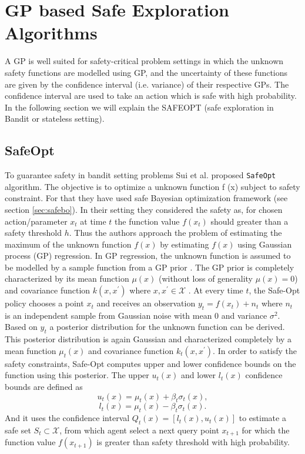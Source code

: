 \section{GP based Safe Exploration Algorithms}
A GP is well suited for safety-critical problem settings in which the unknown safety functions are modelled using GP, and the uncertainty of these functions are given by the confidence interval (i.e. variance) of their respective GPs. 
The confidence interval are used to take an action which is safe with high probability.
In the following section we will explain the SAFEOPT (safe exploration in Bandit or stateless setting).
\subsection{SafeOpt}
To guarantee safety in bandit setting problems Sui et al.\cite{sui15} proposed \texttt{SafeOpt} algorithm. The objective is to optimize a unknown function f (x) subject to safety constraint.
For that they have used safe Bayesian optimization framework (see section \ref{sec:safebo}). 
In their setting they considered the safety as, for chosen action/parameter $x_t$ at time $t$ the function value $f(x_t)$ should greater than a safety threshold $h$. 
Thus the authors approach the problem of estimating the maximum of the unknown function $f(x)$ by estimating $f(x)$ using Gaussian process (GP) regression. 
In GP regression, the unknown function is assumed to be modelled by a sample function from a GP prior \cite{RasmussenW06}. 
The GP prior is completely characterized by its mean function $\mu(x)$ (without loss of generality $\mu(x) = 0$) and covariance function $k(x, x^\prime )$ where $x, x^\prime \in \mathcal{X}$ . 
At every time $t$, the Safe-Opt policy chooses a point $x_t$ and receives an observation $y_t = f (x_t) + n_t$ where $n_t$ is an independent sample from Gaussian noise with mean 0 and variance $\sigma^2$. 
Based on $y_t$ a posterior distribution for the unknown function can be derived. 
This posterior distribution is again Gaussian and characterized completely by a mean function $\mu_t(x)$ and covariance function $k_t (x, x^\prime)$. 
In order to satisfy the safety constraints, Safe-Opt computes upper and lower confidence bounds on the function using this posterior. The upper $u_t(x)$ and lower $l_t(x)$ confidence bounds are defined as 
$$u_t(x)=\mu_t(x)+\beta_t\sigma_t(x),$$
$$l_t(x)=\mu_t(x)-\beta_t\sigma_t(x).$$
And it uses the confidence interval $Q_t(x) = [l_t(x), u_t(x)]$ to estimate a safe set $S_t\subset \mathcal{X}$, from which agent select a next query point $x_{t+1}$ for which the function value $f(x_{t+1})$ is greater than safety threshold with high probability. 
